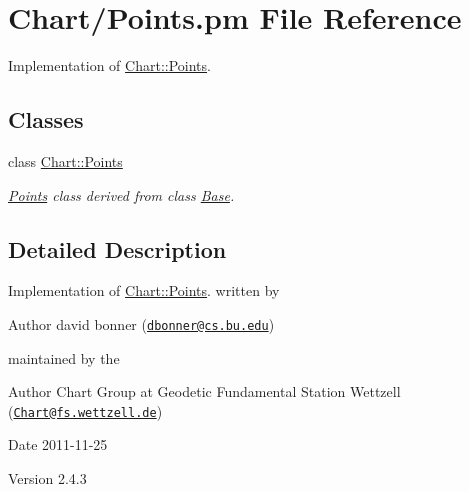 \hypertarget{Points_8pm}{
\section{Chart/Points.pm File Reference}
\label{Points_8pm}
}


Implementation of \hyperlink{classChart_1_1Points}{Chart::Points}.  


\subsection*{Classes}
\begin{DoxyCompactItemize}
\item 
class \hyperlink{classChart_1_1Points}{Chart::Points}
\begin{DoxyCompactList}\small\item\em \hyperlink{classChart_1_1Points}{Points} class derived from class \hyperlink{classChart_1_1Base}{Base}. \item\end{DoxyCompactList}\end{DoxyCompactItemize}


\subsection{Detailed Description}
Implementation of \hyperlink{classChart_1_1Points}{Chart::Points}. written by \begin{DoxyAuthor}{Author}
david bonner (\href{mailto:dbonner@cs.bu.edu}{\tt dbonner@cs.bu.edu})
\end{DoxyAuthor}
maintained by the \begin{DoxyAuthor}{Author}
Chart Group at Geodetic Fundamental Station Wettzell (\href{mailto:Chart@fs.wettzell.de}{\tt Chart@fs.wettzell.de}) 
\end{DoxyAuthor}
\begin{DoxyDate}{Date}
2011-\/11-\/25 
\end{DoxyDate}
\begin{DoxyVersion}{Version}
2.4.3 
\end{DoxyVersion}
